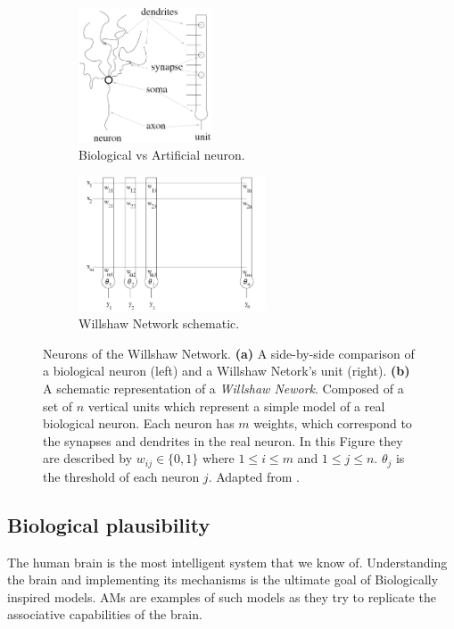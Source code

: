 \documentclass{article}
\begin{document}
\begin{figure}[htbp]
     \centering
     \begin{subfigure}[t]{0.49\textwidth}
         \centering
         \includegraphics[height=4cm]{img/wichert2.png}
         \caption{Biological vs Artificial neuron.}
         \label{WN2}
     \end{subfigure}
     \hfill
     \begin{subfigure}[t]{0.4\textwidth}
         \centering
         \includegraphics[height=4cm]{img/wichert1.png}
         \caption{Willshaw Network schematic.}
         \label{WN1}
     \end{subfigure}
     \hfill
        \caption{Neurons of the Willshaw Network. \textbf{(a)} A side-by-side comparison of a biological neuron (left) and a Willshaw Netork's unit (right). \textbf{(b)} A schematic representation of a \textit{Willshaw Nework}. Composed of a set of  $n$ vertical units which represent a simple model of a real biological neuron. Each neuron has $m$ weights, which correspond to the synapses and dendrites in the real neuron. In this Figure they are described by $w_{ij} \in  \{0,1\}$ where $1\leq i \leq m$ and $1 \leq j \leq n$. $\theta_j$ is the threshold of each neuron $j$. Adapted from \cite{wichert2020principles}.}
        \label{fig:WN}
\end{figure}


\subsection{Biological plausibility}
The human brain is the most intelligent system that we know of. Understanding the brain and implementing its mechanisms is the ultimate goal of Biologically inspired models. AMs are examples of such models as they try to replicate the associative capabilities of the brain.
\end{document}
